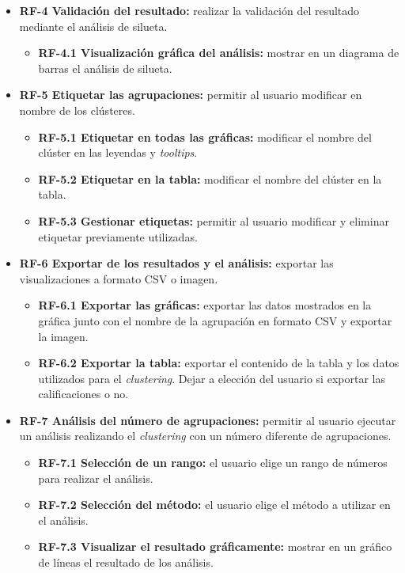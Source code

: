 \begin{itemize}
	\item \textbf{RF-4 Validación del resultado:} realizar la validación del resultado mediante el análisis de silueta.
	\begin{itemize}
		\item \textbf{RF-4.1 Visualización gráfica del análisis:} mostrar en un diagrama de barras el análisis de silueta.
	\end{itemize}

	\item \textbf{RF-5 Etiquetar las agrupaciones:} permitir al usuario modificar en nombre de los clústeres.
	\begin{itemize}
		\item \textbf{RF-5.1 Etiquetar en todas las gráficas:} modificar el nombre del clúster en las leyendas y \emph{tooltips}.
		\item \textbf{RF-5.2 Etiquetar en la tabla:} modificar el nombre del clúster en la tabla.
		\item \textbf{RF-5.3 Gestionar etiquetas:} permitir al usuario modificar y eliminar etiquetar previamente utilizadas.
	\end{itemize}

	\item \textbf{RF-6 Exportar de los resultados y el análisis:} exportar las visualizaciones a formato CSV o imagen.
	\begin{itemize}
		\item \textbf{RF-6.1 Exportar las gráficas:} exportar las datos mostrados en la gráfica junto con el nombre de la agrupación en formato CSV y exportar la imagen.
		\item \textbf{RF-6.2 Exportar la tabla:} exportar el contenido de la tabla y los datos utilizados para el \emph{clustering}. Dejar a elección del usuario si exportar las calificaciones o no.
	\end{itemize}
	
	\item \textbf{RF-7 Análisis del número de agrupaciones:} permitir al usuario ejecutar un análisis realizando el \emph{clustering} con un número diferente de agrupaciones.
	\begin{itemize}
		\item \textbf{RF-7.1 Selección de un rango:} el usuario elige un rango de números para realizar el análisis.
		\item \textbf{RF-7.2 Selección del método:} el usuario elige el método a utilizar en el análisis.
		\item \textbf{RF-7.3 Visualizar el resultado gráficamente:} mostrar en un gráfico de líneas el resultado de los análisis.
	\end{itemize}


\end{itemize}
